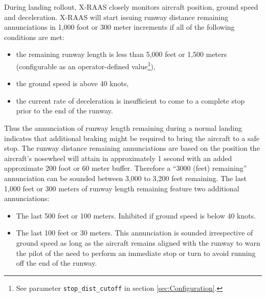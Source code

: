\documentclass[a4paper,12pt]{article}
\newcommand{\confopt}[1]{\texttt{#1}}
\begin{document}
During landing rollout, X-RAAS closely monitors aircraft position, ground
speed and deceleration. X-RAAS will start issuing runway distance
remaining annunciations in 1,000 foot or 300 meter increments if all of
the following conditions are met:

\begin{itemize}

\item the remaining runway length is less than 5,000 feet or 1,500 meters
(configurable as an operator-defined value\footnote{See parameter
\confopt{stop\_dist\_cutoff} in section \ref{sec:Configuration}.}),

\item the ground speed is above 40 knots,

\item the current rate of deceleration is insufficient to come to a
complete stop prior to the end of the runway.

\end{itemize}

\noindent Thus the annunciation of runway length remaining during a
normal landing indicates that additional braking might be required to
bring the aircraft to a safe stop. The runway distance remaining
annunciations are based on the position the aircraft's nosewheel will
attain in approximately 1 second with an added approximate 200 foot or 60
meter buffer. Therefore a ``3000 (feet) remaining'' annunciation can be
sounded between 3,000 to 3,200 feet remaining. The last 1,000 feet or 300
meters of runway length remaining feature two additional annunciations:

\begin{itemize}

\item The last 500 feet or 100 meters. Inhibited if ground speed is below
40 knots.

\item The last 100 feet or 30 meters. This annunciation is sounded
irrespective of ground speed as long as the aircraft remains aligned with
the runway to warn the pilot of the need to perform an immediate stop or
turn to avoid running off the end of the runway.

\end{itemize}
\end{document}
